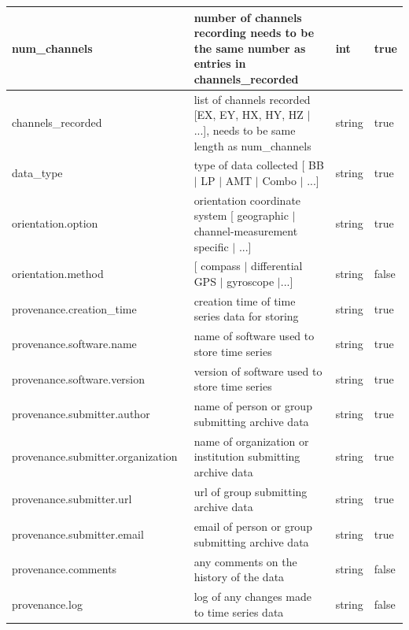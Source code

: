 \documentclass{article}
\begin{document}
\begin{table}[htb!]
\begin{tabular}{|l|p{3in}|l|l|}
        num\_channels\ & number of channels recording needs to be the same number as entries in channels\_recorded & int & true \\ \hline
        channels\_recorded\ & list of channels recorded [EX, EY, HX, HY, HZ $|$ ...], needs to be same length as num\_channels & string & true \\ \hline
        data\_type\ & type of data collected [ BB $|$ LP $|$ AMT $|$ Combo $|$ ...] & string & true \\ \hline
        orientation.option & orientation coordinate system [ geographic $|$ channel-measurement specific $|$ ...] & string & true \\ \hline
        orientation.method & [ compass $|$ differential GPS $|$ gyroscope $|$...] & string & false \\ \hline
        provenance.creation\_time & creation time of time series data for storing & string & true \\ \hline
        provenance.software.name\ & name of software used to store time series & string & true \\ \hline
        provenance.software.version\ & version of software used to store time series & string & true \\ \hline
        provenance.submitter.author\ & name of person or group submitting archive data & string & true \\ \hline
        provenance.submitter.organization\ & name of organization or institution submitting archive data & string & true \\ \hline
        provenance.submitter.url\ & url of group submitting archive data & string & true \\ \hline
        provenance.submitter.email\ & email of person or group submitting archive data & string & true  \\ \hline
        provenance.comments\ & any comments on the history of the data & string & false \\ \hline
        provenance.log\ & log of any changes made to time series data & string & false \\ \hline
    \end{tabular}
\label{tab:station01}
\end{table}    
   
\end{document}

